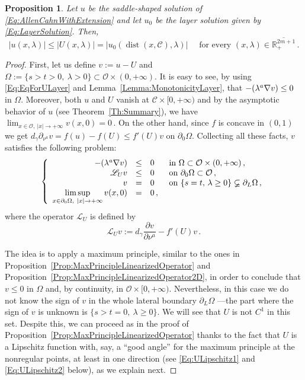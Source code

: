 \documentclass[12pt,reqno]{amsart}
\newtheorem{proposition}[theorem]{Proposition}
\theoremstyle{definition}
\theoremstyle{remark}
\newcommand{\con}[1]{\mathbb{#1}}
\newcommand{\R}{\con{R}} %
\newcommand{\ccal}{\mathscr{C}}
\newcommand{\ocal}{\mathcal{O}}
\newcommand{\s}{\gamma}
\newcommand\beqc[1]{\left\{\begin{array}{#1}}
\newcommand\eeqc{\end{array} \right.}
\def\PDEsystem{rcll}
\DeclareMathOperator{\dist}{dist}
\let\div\relax
\DeclareMathOperator{\div}{div}
\def\ds{\displaystyle}
\numberwithin{equation}{section}
\begin{document}
\begin{proposition}
\label{Prop:SaddleUnderLayer}
Let $u$ be the saddle-shaped solution of \eqref{Eq:AllenCahnWithExtension} and let $u_0$ be the layer solution given by \eqref{Eq:LayerSolution}. Then, 
\begin{equation}
\label{Eq:SaddleUnderLayer}
|u(x,\lambda)| \leq |U(x,\lambda)| = |u_0 ( \dist(x, \ccal), \lambda) | \quad \text{ for every } (x,\lambda)\in \overline{\R^{2m+1}_+}\,.
\end{equation}
\end{proposition}

\begin{proof}
First, let us define $v:= u - U$ and $\Omega := \{s>t>0, \ \lambda > 0\} \subset \ocal \times (0, +\infty)$. It is easy to see, by using \eqref{Eq:EqForULayer} and Lemma~\ref{Lemma:MonotonicityLayer}, that $-\div (\lambda^a \nabla v) \leq 0$ in $\Omega$. Moreover, both $u$ and $U$ vanish at $\ccal \times [0,+\infty)$ and by the asymptotic behavior of $u$ (see Theorem~\ref{Th:Summary}), we have $\lim_{x\in  \ocal,\ |x|\to +\infty} v(x,0) = 0\,$. On the other hand, since $f$ is concave in $(0,1)$ we get $d_\s \partial_{\nu^a} v = f(u) - f(U) \leq f'(U)v$ on $\partial_0 \Omega$. Collecting all these facts, $v$ satisfies the following problem:
$$
\beqc{\PDEsystem}
-\div(\lambda^a \nabla v) &\leq& 0 & \text{ in } \Omega \subset \ocal \times (0,+\infty)\,, \\
\mathscr{L}_U v &\leq & 0 & \text{ on } \partial_0 \Omega \subset \ocal \,, \\
v & = & 0 & \text{ on } \{s=t,\, \lambda \geq 0\}\varsubsetneq\partial_L \Omega \,,\\
\ds \limsup_{x\in \partial_0 \Omega, \ |x|\to +\infty} v(x,0) & = & 0\,,
\eeqc
$$
where the operator $\mathscr{L}_U$ is defined by 
$$
\mathscr{L}_U v := d_\s \dfrac{\partial v}{\partial \nu^a}  -f'(U) v \,.
$$

The idea is to apply a maximum principle, similar to the ones in Proposition~\ref{Prop:MaxPrincipleLinearizedOperator} and Proposition~\ref{Prop:MaxPrincipleLinearizedOperator2D}, in order to conclude that $v\leq 0$ in $\Omega$ and, by continuity, in $\ocal\times[0,+\infty)$. Nevertheless, in this case we do not know the sign of $v$ in the whole lateral boundary $\partial_L \Omega$ ---the part where the sign of $v$ is unknown is $\{s > t= 0,\ \lambda \geq 0\}$. We will see that $U$ is not $C^1$ in this set. Despite this, we can proceed as in the proof of Proposition~\ref{Prop:MaxPrincipleLinearizedOperator} thanks to the fact that $U$ is a Lipschitz function with, say, a ``good angle'' for the maximum principle at the nonregular points, at least in one direction (see \eqref{Eq:ULipschitz1} and \eqref{Eq:ULipschitz2} below), as we explain next.



\end{proof}
\end{document}
